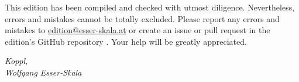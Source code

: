 \documentclass[parskip=full]{scrreprt}
\newif\iftemplate\templatetrue
\begin{document}
This edition has been compiled and checked with utmost diligence. Nevertheless, errors and mistakes cannot be totally excluded. Please report any errors and mistakes to \url{edition@esser-skala.at} or create an issue or pull request in the edition’s GitHub repository \userepository. Your help will be greatly appreciated.

\bigskip
\textit{Koppl,  \\
Wolfgang Esser-Skala}

\cleardoublepage
{}


\cleardoublepage
\fi

\iftemplate

\fi
\end{document}
